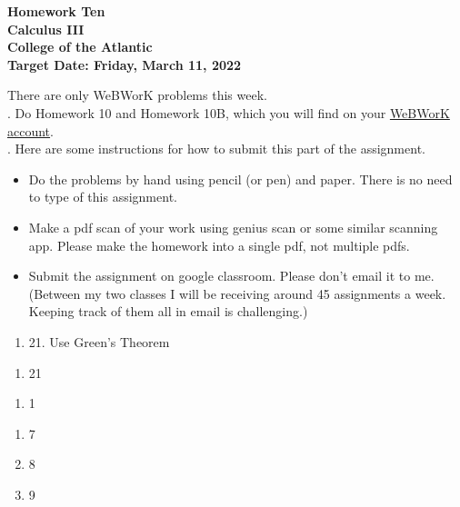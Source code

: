 \documentclass[12pt]{article}
\begin{document}
\pagestyle{empty}
 
\begin{center}
{\LARGE {\bf Homework Ten}}\\
\bigskip
{\Large {\bf Calculus III}}\\
\bigskip
{\Large {\bf College of the Atlantic}}\\
\bigskip
{ {\bf Target Date: Friday, March 11, 2022}}\\  
\end{center}
\medskip


\noindent There are only WeBWorK problems this week.\\

.  Do Homework 10 and Homework 10B,
which you will find on your
\href{https://webwork.runestone.academy/webwork2/coa-feldman-es3028m-winter-2022/}{WeBWorK account}.\\ 


.  Here are some
instructions for how to submit this part of the assignment.
\begin{itemize}
\item Do the problems by hand using pencil (or pen) and paper.
  There is no need to type of this assignment.
\item Make a pdf scan of your work using genius scan or some
  similar scanning app.  Please make the homework into a single
  pdf, not multiple pdfs.
\item Submit the assignment on google classroom.  Please don't
  email it to me.  (Between my two classes I will be receiving
  around 45 assignments a week.  Keeping track of them all in email 
  is challenging.)\\
\end{itemize}


\begin{enumerate}
\setlength{\itemsep}{-1mm}
\item 21.  Use Green's Theorem
\end{enumerate}

\begin{enumerate}
\setlength{\itemsep}{-1mm}
\item 21
\end{enumerate}

\begin{enumerate}
\setlength{\itemsep}{-1mm}
\item 1
\end{enumerate}


\begin{enumerate}
\setlength{\itemsep}{-1mm}
\item 7
\item 8
\item 9
\end{enumerate}
\end{document}
